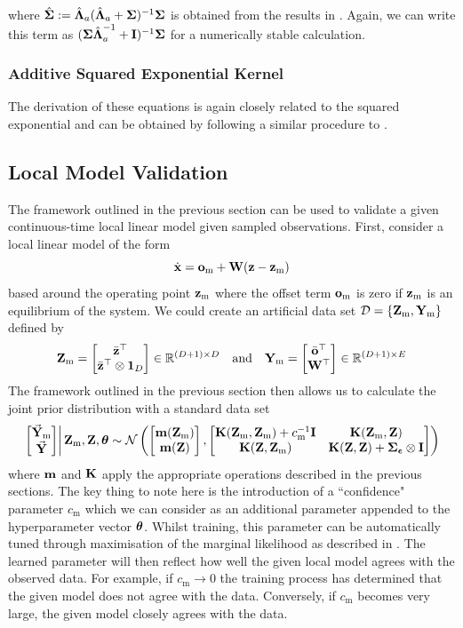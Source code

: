 where $\hat{\boldsymbol{\Sigma}} := \hat{\boldsymbol{\Lambda}}_a(\hat{\boldsymbol{\Lambda}}_a+\boldsymbol{\Sigma})^{-1}\boldsymbol{\Sigma}$ is obtained from the results in . Again, we can write this term as $(\boldsymbol{\Sigma}\hat{\boldsymbol{\Lambda}}^{-1}_a + \mathbf{I})^{-1}\boldsymbol{\Sigma}$ for a numerically stable calculation.


\subsubsection{Additive Squared Exponential Kernel}
The derivation of these equations is again closely related to the squared exponential and can be obtained by following a similar procedure to .



\subsection{Local Model Validation}
The framework outlined in the previous section can be used to validate a given continuous-time local linear model given sampled observations. First, consider a local linear model of the form
\begin{equation*}
\dot{\mathbf{x}} = \mathbf{o}_{\text{m}} + \mathbf{W}(\mathbf{z} - \mathbf{z}_{\text{m}})
\end{equation*}
based around the operating point $\mathbf{z}_{\text{m}}$ where the offset term $\mathbf{o}_{\text{m}}$ is zero if $\mathbf{z}_{\text{m}}$ is an equilibrium of the system. We could create an artificial data set $\mathcal{D} = \{\mathbf{Z}_{\text{m}},\mathbf{Y}_{\text{m}}\}$ defined by
\begin{equation*}
\mathbf{Z}_{\text{m}} = \begin{bmatrix} \bar{\mathbf{z}}^\top \\ \bar{\mathbf{z}}^\top \otimes \mathbf{1}_D \end{bmatrix} \in \mathbb{R}^{(D+1)\times D}
\quad\text{and}\quad
\mathbf{Y}_{\text{m}} = \begin{bmatrix} \bar{\mathbf{o}}^\top \\ \mathbf{W}^\top \end{bmatrix} \in \mathbb{R}^{(D+1)\times E}
\end{equation*}
The framework outlined in the previous section then allows us to calculate the joint prior distribution with a standard data set
\begin{equation*}
\left.\begin{bmatrix} \vec{\mathbf{Y}}_{\text{m}} \\ \vec{\mathbf{Y}} \end{bmatrix} \right| \mathbf{Z}_{\text{m}}, \mathbf{Z}, \boldsymbol{\theta}  \sim \mathcal{N}\left(
\begin{bmatrix}  \mathbf{m}(\mathbf{Z}_{\text{m}}) \\ \mathbf{m}(\mathbf{Z})  \end{bmatrix},
\begin{bmatrix} \mathbf{K}(\mathbf{Z}_{\text{m}},\mathbf{Z}_{\text{m}})+ c_{\text{m}}^{-1} \mathbf{I} & \mathbf{K}(\mathbf{Z}_{\text{m}},\mathbf{Z}) \\ 
\mathbf{K}(\mathbf{Z},\mathbf{Z}_{\text{m}}) & \mathbf{K}(\mathbf{Z},\mathbf{Z}) + \boldsymbol{\Sigma}_{\boldsymbol{\epsilon}} \otimes \mathbf{I}  \end{bmatrix}
\right)
\end{equation*}
where $\mathbf{m}$ and $\mathbf{K}$ apply the appropriate operations described in the previous sections. The key thing to note here is the introduction of a ``confidence" parameter $c_{\text{m}}$ which we can consider as an additional parameter appended to the hyperparameter vector $\boldsymbol{\theta}$. Whilst training, this parameter can be automatically tuned through maximisation of the marginal likelihood as described in . The learned parameter will then reflect how well the given local model agrees with the observed data. For example, if $c_{\text{m}} \rightarrow 0$ the training process has determined that the given model does not agree with the data. Conversely, if $c_{\text{m}}$ becomes very large, the given model closely agrees with the data.
